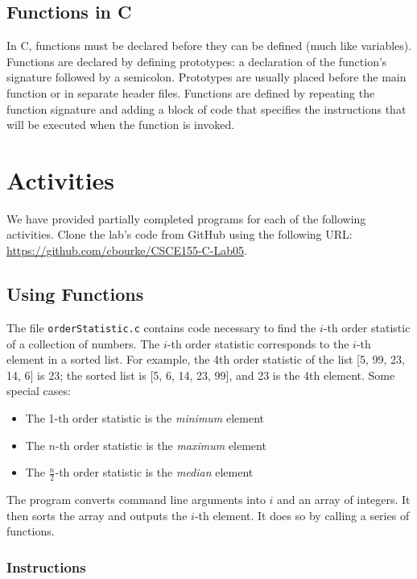 \documentclass[12pt]{scrartcl}
\begin{document}
\subsection{Functions in C}

In C, functions must be declared before they can be defined (much 
like variables).  Functions are declared by defining prototypes: a 
declaration of the function's signature followed by a semicolon.  
Prototypes are usually placed before the main function or in 
separate header files.  Functions are defined by repeating the 
function signature and adding a block of code that specifies the 
instructions that will be executed when the function is invoked.

\section{Activities}

We have provided partially completed programs for each of the 
following activities.  Clone the lab's code from GitHub using the 
following URL: \url{https://github.com/cbourke/CSCE155-C-Lab05}.

\subsection{Using Functions}

The file \texttt{orderStatistic.c} contains code necessary
to find the $i$-th order statistic of a collection of numbers.   The $i$-th order 
statistic corresponds to the $i$-th element in a sorted list.  For example, 
the 4th order statistic of the list [5, 99, 23, 14, 6] is 23; the sorted list 
is [5, 6, 14, 23, 99], and 23 is the 4th element.  Some special cases:
\begin{itemize}
  \item The 1-th order statistic is the \emph{minimum} element
  \item The $n$-th order statistic is the \emph{maximum} element
  \item The $\frac{n}{2}$-th order statistic is the \emph{median} element
\end{itemize}
The program converts command line arguments into $i$ and an
array of integers.  It then sorts the array and outputs the $i$-th 
element.  It does so by calling a series of functions.

\subsubsection*{Instructions}
\end{document}
